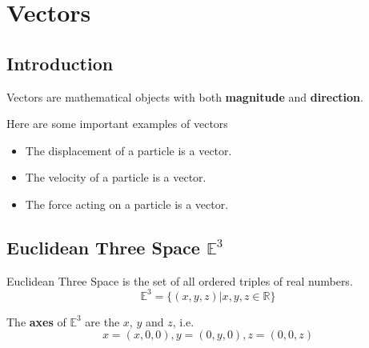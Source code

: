 \chapter{Vectors}

\section{Introduction}

\begin{definition}[Vectors]
  Vectors are mathematical objects with both {\bf magnitude} and {\bf direction}.
\end{definition}

\begin{eg}
  Here are some important examples of vectors\\
  \vspace{-10px}
  \begin{itemize}
    \item The displacement of a particle is a vector.
    \item The velocity of a particle is a vector.
    \item The force acting on a particle is a vector.
  \end{itemize}

\end{eg}

\section{Euclidean Three Space $\mathbb{E}^3$}

\begin{definition}
 
  Euclidean Three Space is the set of all ordered triples of real numbers.\\
  \vspace{-10px}
  \begin{equation}
    \mathbb{E}^3 = \{(x,y,z) | x,y,z \in \mathbb{R}\}
  \end{equation}

\end{definition}

The \textbf{axes} of $\mathbb{E}^{3}$ are the $x$, $y$ and $z$, i.e.
\vspace{-10px}
\begin{equation}
  x = (x,0,0), y = (0,y,0), z = (0,0,z)
\end{equation}

